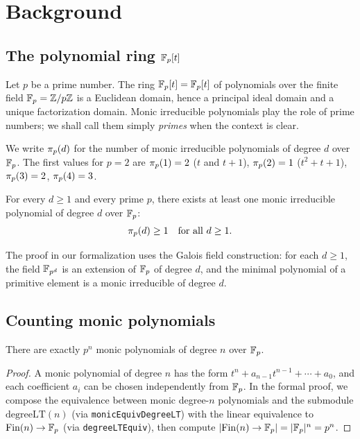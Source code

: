 \section{Background}\label{sec:background}

\subsection{The polynomial ring \texorpdfstring{$\mathbb{F}_p[t]$}{Fp[t]}}

Let $p$ be a prime number. The ring $\mathbb{F}_p[t] = \mathbb{F}_p[t]$ of polynomials over the
finite field $\mathbb{F}_p = \mathbb{Z}/p\mathbb{Z}$ is a Euclidean domain, hence a principal ideal
domain and a unique factorization domain. Monic irreducible polynomials play
the role of prime numbers; we shall call them simply \emph{primes} when the
context is clear.

We write $\pi_p(d)$ for the number of monic irreducible polynomials of
degree $d$ over $\mathbb{F}_p$. The first values for $p = 2$ are $\pi_p(1) = 2$
($t$ and $t+1$), $\pi_p(2) = 1$ ($t^2 + t + 1$), $\pi_p(3) = 2$,
$\pi_p(4) = 3$.

\begin{proposition}
For every $d \geq 1$ and every prime $p$, there exists at least one monic
irreducible polynomial of degree $d$ over $\mathbb{F}_p$:
\[
  \pi_p(d) \geq 1 \quad \text{for all } d \geq 1.
\]
\end{proposition}

The proof in our formalization uses the Galois field construction: for each
$d \geq 1$, the field $\mathbb{F}_{p^{d}}$ is an extension of $\mathbb{F}_p$ of degree $d$,
and the minimal polynomial of a primitive element is a monic irreducible of
degree $d$.

\subsection{Counting monic polynomials}

\begin{proposition}
There are exactly $p^n$ monic polynomials of degree $n$ over $\mathbb{F}_p$.
\end{proposition}

\begin{proof}
A monic polynomial of degree $n$ has the form $t^n + a_{n-1}t^{n-1} + \cdots
+ a_0$, and each coefficient $a_i$ can be chosen independently from $\mathbb{F}_p$.
In the formal proof, we compose the equivalence between monic
degree-$n$ polynomials and the submodule $\mathrm{degreeLT}(n)$
(via \texttt{monicEquivDegreeLT}) with the linear equivalence to
$\mathrm{Fin}(n) \to \mathbb{F}_p$ (via \texttt{degreeLTEquiv}), then compute
$|\mathrm{Fin}(n) \to \mathbb{F}_p| = |\mathbb{F}_p|^n = p^n$.
\end{proof}

